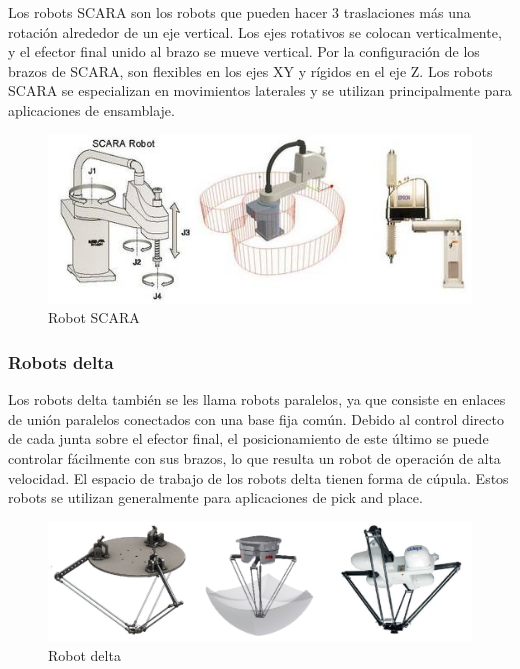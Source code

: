         Los robots SCARA son los robots que pueden hacer 3 traslaciones más una rotación alrededor de un eje vertical. Los ejes rotativos se colocan verticalmente, y el efector final unido al brazo se mueve vertical. Por la configuración de los brazos de SCARA, son flexibles en los ejes XY y rígidos en el eje Z. Los robots SCARA se especializan en movimientos laterales y se utilizan principalmente para aplicaciones de ensamblaje. 
        
        \begin{figure}[htb]
            \centering
            \includegraphics[width=0.9\linewidth]{Main/Chapter2/Images2/Robot-SCARA.png}
            \caption{Robot SCARA  \cite{cap2_class_mov}}
            \label{f:Cap2_segunMovimiento_scara}
        \end{figure}
        
        \subsubsection{Robots delta}
        
        Los robots delta también se les llama robots paralelos, ya que consiste en enlaces de unión paralelos conectados con una base fija común. Debido al control directo de cada junta sobre el efector final, el posicionamiento de este último se puede controlar fácilmente con sus brazos, lo que resulta un robot de operación de alta velocidad. El espacio de trabajo de los robots delta tienen forma de cúpula. Estos robots se utilizan generalmente para aplicaciones de pick and place.
        
        \begin{figure}[htb]
            \centering
            \includegraphics[width=0.9\linewidth]{Main/Chapter2/Images2/Robot-delta.png}
            \caption{Robot delta \cite{cap2_rdelta_1}\cite{cap2_rdelta_2}\cite{cap2_rdelta_3}}
            \label{f:Cap2_segunMovimiento_delta}
        \end{figure}
        
